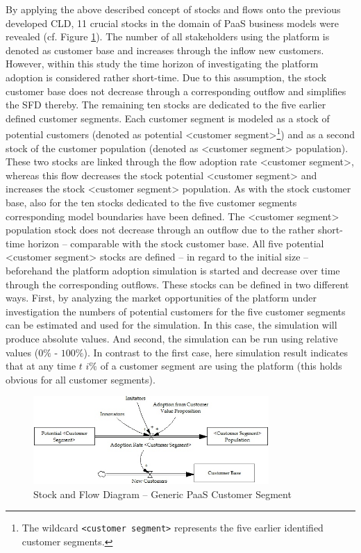 By applying the above described concept of stocks and flows onto the previous developed \ac{CLD}, 11 crucial stocks in the domain of \ac{PaaS} business models were revealed (cf. Figure \ref{fig:sfd_cs}). The number of all stakeholders using the platform is denoted as customer base and increases through the inflow new customers. However, within this study the time horizon of investigating the platform adoption is considered rather short-time. Due to this assumption, the stock customer base does not decrease through a corresponding outflow and simplifies the \ac{SFD} thereby. The remaining ten stocks are dedicated to the five earlier defined customer segments. Each customer segment is modeled as a stock of potential customers (denoted as potential <customer segment>\footnote{The wildcard \texttt{<customer segment>} represents the five earlier identified customer segments.}) and as a second stock of the customer population (denoted as <customer segment> population). These two stocks are linked through the flow adoption rate <customer segment>, whereas this flow decreases the stock potential <customer segment> and increases the stock <customer segment> population. As with the stock customer base, also for the ten stocks dedicated to the five customer segments corresponding model boundaries have been defined. The <customer segment> population stock does not decrease through an outflow due to the rather short-time horizon -- comparable with the stock customer base. All five potential <customer segment> stocks are defined -- in regard to the initial size -- beforehand the platform adoption simulation is started and decrease over time through the corresponding outflows. These stocks can be defined in two different ways. First, by analyzing the market opportunities of the platform under investigation the numbers of potential customers for the five customer segments can be estimated and used for the simulation. In this case, the simulation will produce absolute values. And second, the simulation can be run using relative values ($0\%$ - $100\%$). In contrast to the first case, here simulation result indicates that at any time $t$ $i\%$ of a customer segment are using the platform (this holds obvious for all customer segments).

\begin{figure}[tb]
	\centering
	\includegraphics[width=0.8\textwidth]{gfx/sfd_customerSegment}
	\caption{Stock and Flow Diagram -- Generic PaaS Customer Segment}
	\label{fig:sfd_cs}
\end{figure}

